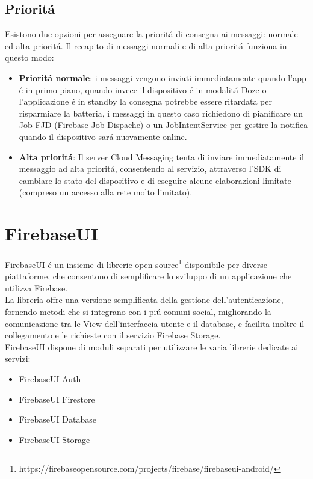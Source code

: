 \subsection{Priorit\'a}
Esistono due opzioni per assegnare la priorit\'a di consegna ai messaggi: normale ed alta priorit\'a. Il recapito di messaggi normali e di alta priorit\'a funziona in questo modo:
\begin{itemize}
\item  \textbf{Priorit\'a normale}: i messaggi vengono inviati immediatamente quando l'app \'e in primo piano, quando invece il dispositivo \'e in modalit\'a Doze o l'applicazione \'e in standby la consegna potrebbe essere ritardata per risparmiare la batteria, i messaggi in questo caso richiedono di pianificare un Job FJD (Firebase Job Dispache) o un JobIntentService per gestire la notifica quando il dispositivo sar\'a nuovamente online.
\item \textbf{Alta priorit\'a}: Il server Cloud Messaging tenta di inviare immediatamente il messaggio ad alta priorit\'a, consentendo al servizio, attraverso l'SDK di cambiare lo stato del dispositivo e di eseguire alcune elaborazioni limitate (compreso un accesso alla rete molto limitato).
\end{itemize}





\section{FirebaseUI}                 %
FirebaseUI \'e un insieme di librerie open-source\footnote{https://firebaseopensource.com/projects/firebase/firebaseui-android/} disponibile per diverse piattaforme, che consentono di semplificare lo sviluppo di un applicazione che utilizza Firebase.\\
La libreria offre una versione semplificata della gestione dell'autenticazione, fornendo metodi che si integrano con i pi\'u comuni social, migliorando la comunicazione tra le View dell'interfaccia utente e il database, e facilita inoltre il collegamento e le richieste con il servizio Firebase Storage.\\
FirebaseUI dispone di moduli separati per utilizzare le varia librerie dedicate ai servizi:
\begin{itemize}
  \item  FirebaseUI Auth
  \item  FirebaseUI Firestore
  \item  FirebaseUI Database
  \item  FirebaseUI Storage
\end{itemize}


